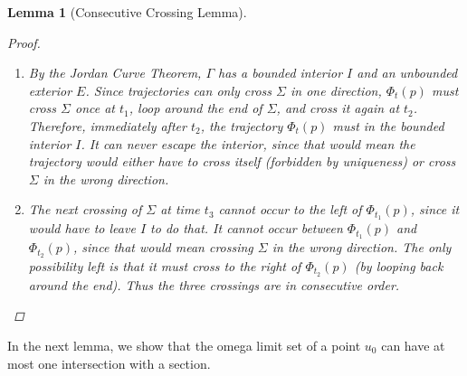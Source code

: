 \documentclass{article}
\newtheorem{lemma}[theorem]{Lemma}
\begin{document}
\begin{lemma}[Consecutive Crossing Lemma]
\begin{proof}
\begin{enumerate}
\item By the Jordan Curve Theorem, $\Gamma$ has a bounded interior $I$ and an unbounded exterior $E$. Since trajectories can only cross $\Sigma$ in one direction, $\Phi_t(p)$ must cross $\Sigma$ once at $t_1$, loop around the end of $\Sigma$, and cross it again at $t_2$. Therefore, immediately after $t_2$, the trajectory $\Phi_t(p)$ must in the bounded interior $I$. It can never escape the interior, since that would mean the trajectory would either have to cross itself (forbidden by uniqueness) or cross $\Sigma$ in the wrong direction.

\item The next crossing of $\Sigma$ at time $t_3$ cannot occur to the left of $\Phi_{t_1}(p)$, since it would have to leave $I$ to do that. It cannot occur between $\Phi_{t_1}(p)$ and $\Phi_{t_2}(p)$, since that would mean crossing $\Sigma$ in the wrong direction. The only possibility left is that it must cross to the right of $\Phi_{t_2}(p)$ (by looping back around the end). Thus the three crossings are in consecutive order. 

\end{enumerate}
\end{proof}
\end{lemma}

In the next lemma, we show that the omega limit set of a point $u_0$ can have at most one intersection with a section.
\end{document}
